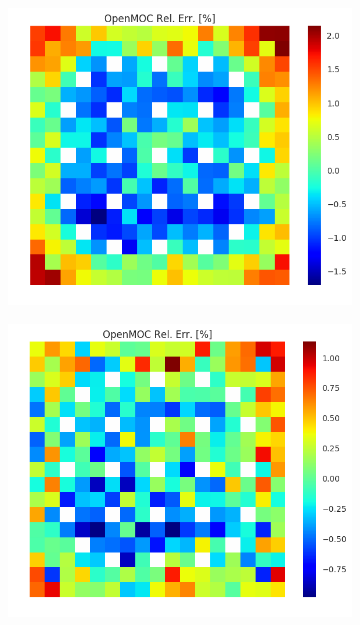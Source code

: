 \begin{figure}[h!]
\begin{subfigure}{.33\textwidth}
  \caption{}
  \label{fig:chap8-assm-1.6-null-fiss-70}
\end{subfigure}
\begin{subfigure}{.33\textwidth}
  \centering
  \includegraphics[width=\linewidth]{figures/quantification/assm-16/degenerate-fiss-err-2}
  \caption{}
  \label{fig:chap8-assm-1.6-degenerate-fiss-2}
\end{subfigure}%
\begin{subfigure}{.33\textwidth}
  \centering
  \includegraphics[width=\linewidth]{figures/quantification/assm-16/degenerate-fiss-err-8}

\end{subfigure}
\end{figure}
